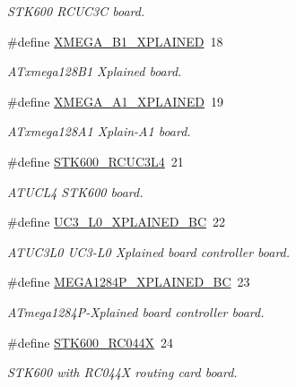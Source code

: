\begin{DoxyCompactItemize}
\begin{DoxyCompactList}\small\item\em S\-T\-K600 R\-C\-U\-C3\-C board. \end{DoxyCompactList}\item 
\#define \hyperlink{group__group__common__boards_ga65d609abff1a09882fd8a778c97f8ab2}{X\-M\-E\-G\-A\-\_\-\-B1\-\_\-\-X\-P\-L\-A\-I\-N\-E\-D}~18
\begin{DoxyCompactList}\small\item\em A\-Txmega128\-B1 Xplained board. \end{DoxyCompactList}\item 
\#define \hyperlink{group__group__common__boards_gae79074f51491bf88c25efd857b92cbd4}{X\-M\-E\-G\-A\-\_\-\-A1\-\_\-\-X\-P\-L\-A\-I\-N\-E\-D}~19
\begin{DoxyCompactList}\small\item\em A\-Txmega128\-A1 Xplain-\/\-A1 board. \end{DoxyCompactList}\item 
\#define \hyperlink{group__group__common__boards_ga8eec8cd16b9138bb1117e9381138a3fc}{S\-T\-K600\-\_\-\-R\-C\-U\-C3\-L4}~21
\begin{DoxyCompactList}\small\item\em A\-T\-U\-C\-L4 S\-T\-K600 board. \end{DoxyCompactList}\item 
\#define \hyperlink{group__group__common__boards_gab872a6d2f79f1bbb274b5f9fff4b855f}{U\-C3\-\_\-\-L0\-\_\-\-X\-P\-L\-A\-I\-N\-E\-D\-\_\-\-B\-C}~22
\begin{DoxyCompactList}\small\item\em A\-T\-U\-C3\-L0 U\-C3-\/\-L0 Xplained board controller board. \end{DoxyCompactList}\item 
\#define \hyperlink{group__group__common__boards_ga9acdb5a6b5436d3bf40bdfa8c1338152}{M\-E\-G\-A1284\-P\-\_\-\-X\-P\-L\-A\-I\-N\-E\-D\-\_\-\-B\-C}~23
\begin{DoxyCompactList}\small\item\em A\-Tmega1284\-P-\/\-Xplained board controller board. \end{DoxyCompactList}\item 
\#define \hyperlink{group__group__common__boards_ga53054d452a89f550fcdff65adc167f88}{S\-T\-K600\-\_\-\-R\-C044\-X}~24
\begin{DoxyCompactList}\small\item\em S\-T\-K600 with R\-C044\-X routing card board. \end{DoxyCompactList}\item 

\end{DoxyCompactItemize}
